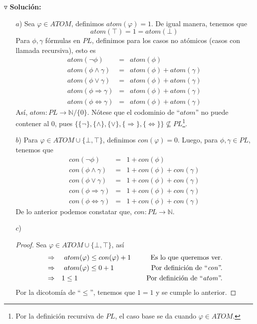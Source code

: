 \documentclass{article}
\begin{document}
\begin{enumerate}
  $\triangledown$ \textbf{Solución:}
  \begin{itemize}
  \item[$a$)] Sea $\varphi \in ATOM$, definimos $atom(\varphi) = 1$. De igual manera,
    tenemos que
    \[
    atom(\top) = 1 = atom(\bot)
    \]
    Para $\phi, \gamma$ fórmulas en $PL$, definimos para los casos no atómicos (casos con
    llamada recursiva), esto es
    \begin{eqnarray*}
      atom(\neg \phi) &=& atom(\phi)\\
      atom(\phi \land \gamma) &=& atom(\phi) + atom(\gamma)\\
      atom(\phi \lor \gamma) &=& atom(\phi) + atom(\gamma)\\
      atom(\phi \Rightarrow \gamma) &=& atom(\phi) + atom(\gamma)\\
      atom(\phi \Leftrightarrow \gamma) &=& atom(\phi) + atom(\gamma)
    \end{eqnarray*}
    Así, $atom: PL \rightarrow \mathbb{N}/\{0\}$. Nótese que el codominio de ``$atom$'' no puede
    contener al $0$, pues $\{\{\neg\}, \{\land\}, \{\lor\}, \{\Rightarrow\}, \{\Leftrightarrow\}\}
    \nsubseteq PL$\footnote{Por la definición recursiva de $PL$, el caso base se da cuando $\varphi
    \in ATOM$.}.
  \item[$b$)] Para $\varphi \in ATOM \cup \{\bot, \top\}$, definimos $con(\varphi) = 0$. Luego, para
    $\phi, \gamma \in PL$, tenemos que
    \begin{eqnarray*}
      con(\neg \phi) &=& 1 + con(\phi)\\
      con(\phi \land \gamma) &=& 1 + con(\phi) + con(\gamma)\\
      con(\phi \lor \gamma) &=& 1 + con(\phi) + con(\gamma)\\
      con(\phi \Rightarrow \gamma) &=& 1 + con(\phi) + con(\gamma)\\
      con(\phi \Leftrightarrow \gamma) &=& 1 + con(\phi) + con(\gamma)
    \end{eqnarray*}
    De lo anterior podemos constatar que, $con: PL \rightarrow \mathbb{N}$.
  \item[$c$)] \begin{proof}
    Sea $\varphi \in ATOM \cup \{\bot, \top\}$, así
    \begin{eqnarray*}
      &\Rightarrow& atom(\varphi) \leq  con(\varphi) + 1
      \hspace*{1cm} \text{Es lo que queremos ver.}\\
      &\Rightarrow& atom(\varphi) \leq 0 + 1
      \hspace*{1.9cm} \text{Por definición de ``\textit{con}''.}\\
      &\Rightarrow& 1 \leq 1
      \hspace*{3.5cm} \text{Por definición de ``\textit{atom}''.}
    \end{eqnarray*}
    Por la dicotomía de ``$\leq$'', tenemos que $1 = 1$ y se cumple lo anterior.
    

\end{proof}
\end{itemize}
\end{enumerate}
\end{document}
